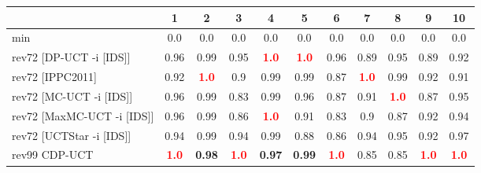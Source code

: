 \documentclass{article}
\begin{document}
\begin{tabular}{|l|r@{$\pm$}rr@{$\pm$}rr@{$\pm$}rr@{$\pm$}rr@{$\pm$}rr@{$\pm$}rr@{$\pm$}rr@{$\pm$}rr@{$\pm$}rr@{$\pm$}r|}
\hline

& \multicolumn{2}{c}{1}
& \multicolumn{2}{c}{2}
& \multicolumn{2}{c}{3}
& \multicolumn{2}{c}{4}
& \multicolumn{2}{c}{5}
& \multicolumn{2}{c}{6}
& \multicolumn{2}{c}{7}
& \multicolumn{2}{c}{8}
& \multicolumn{2}{c}{9}
& \multicolumn{2}{c|}{10}
\\
\hline
\hline
min
& \multicolumn{2}{c}{0.0}
& \multicolumn{2}{c}{0.0}
& \multicolumn{2}{c}{0.0}
& \multicolumn{2}{c}{0.0}
& \multicolumn{2}{c}{0.0}
& \multicolumn{2}{c}{0.0}
& \multicolumn{2}{c}{0.0}
& \multicolumn{2}{c}{0.0}
& \multicolumn{2}{c}{0.0}
& \multicolumn{2}{c|}{0.0}
\\
rev72 [DP-UCT -i [IDS]]
& \multicolumn{2}{c}{0.96}
& \multicolumn{2}{c}{0.99}
& \multicolumn{2}{c}{0.95}
& \multicolumn{2}{c}{\textbf{\textcolor{red}{1.0}}}
& \multicolumn{2}{c}{\textbf{\textcolor{red}{1.0}}}
& \multicolumn{2}{c}{0.96}
& \multicolumn{2}{c}{0.89}
& \multicolumn{2}{c}{0.95}
& \multicolumn{2}{c}{0.89}
& \multicolumn{2}{c|}{0.92}
\\
rev72 [IPPC2011]
& \multicolumn{2}{c}{0.92}
& \multicolumn{2}{c}{\textbf{\textcolor{red}{1.0}}}
& \multicolumn{2}{c}{0.9}
& \multicolumn{2}{c}{0.99}
& \multicolumn{2}{c}{0.99}
& \multicolumn{2}{c}{0.87}
& \multicolumn{2}{c}{\textbf{\textcolor{red}{1.0}}}
& \multicolumn{2}{c}{0.99}
& \multicolumn{2}{c}{0.92}
& \multicolumn{2}{c|}{0.91}
\\
rev72 [MC-UCT -i [IDS]]
& \multicolumn{2}{c}{0.96}
& \multicolumn{2}{c}{0.99}
& \multicolumn{2}{c}{0.83}
& \multicolumn{2}{c}{0.99}
& \multicolumn{2}{c}{0.96}
& \multicolumn{2}{c}{0.87}
& \multicolumn{2}{c}{0.91}
& \multicolumn{2}{c}{\textbf{\textcolor{red}{1.0}}}
& \multicolumn{2}{c}{0.87}
& \multicolumn{2}{c|}{0.95}
\\
rev72 [MaxMC-UCT -i [IDS]]
& \multicolumn{2}{c}{0.96}
& \multicolumn{2}{c}{0.99}
& \multicolumn{2}{c}{0.86}
& \multicolumn{2}{c}{\textbf{\textcolor{red}{1.0}}}
& \multicolumn{2}{c}{0.91}
& \multicolumn{2}{c}{0.83}
& \multicolumn{2}{c}{0.9}
& \multicolumn{2}{c}{0.87}
& \multicolumn{2}{c}{0.92}
& \multicolumn{2}{c|}{0.94}
\\
rev72 [UCTStar -i [IDS]]
& \multicolumn{2}{c}{0.94}
& \multicolumn{2}{c}{0.99}
& \multicolumn{2}{c}{0.94}
& \multicolumn{2}{c}{0.99}
& \multicolumn{2}{c}{0.88}
& \multicolumn{2}{c}{0.86}
& \multicolumn{2}{c}{0.94}
& \multicolumn{2}{c}{0.95}
& \multicolumn{2}{c}{0.92}
& \multicolumn{2}{c|}{0.97}
\\
\hline
rev99 CDP-UCT
& \multicolumn{2}{c}{\textbf{\textcolor{red}{1.0}}}
& \multicolumn{2}{c}{\textbf{0.98}}
& \multicolumn{2}{c}{\textbf{\textcolor{red}{1.0}}}
& \multicolumn{2}{c}{\textbf{0.97}}
& \multicolumn{2}{c}{\textbf{0.99}}
& \multicolumn{2}{c}{\textbf{\textcolor{red}{1.0}}}
& \multicolumn{2}{c}{0.85}
& \multicolumn{2}{c}{0.85}
& \multicolumn{2}{c}{\textbf{\textcolor{red}{1.0}}}
& \multicolumn{2}{c|}{\textbf{\textcolor{red}{1.0}}}
\\
\hline
\end{tabular}%
\end{document}
